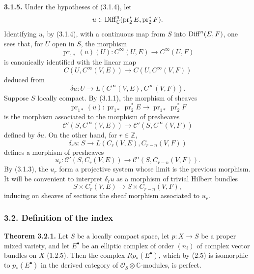 \documentclass[11pt]{article}
\begin{document}
\textbf{3.1.5.} Under the hypotheses of (3.1.4), let
\[
 u\in\operatorname{Diff}^n_{\mathbb C}(\operatorname{pr}_2^*E,\operatorname{pr}_2^*F).
\]
Identifying $u$, by (3.1.4), with a continuous map from $S$ into $\operatorname{Diff}^n(E,F)$, one sees that, for $U$ open in $S$, the morphism
\[
 \operatorname{pr}_{1*}(u)(U):C^\infty(U,E)\longrightarrow C^\infty(U,F)
\]
is canonically identified with the linear map
\[
 C(U,C^\infty(V,E))\longrightarrow C(U,C^\infty(V,F))
\]
deduced from
\[
 \delta u:U\longrightarrow L(C^\infty(V,E),C^\infty(V,F)).
\]
Suppose $S$ locally compact. By (3.1.1), the morphism of sheaves
\[
 \operatorname{pr}_{1*}(u):
 \operatorname{pr}_{1*}\operatorname{pr}_2^*E
 \longrightarrow
 \operatorname{pr}_{1*}\operatorname{pr}_2^*F
\]
is the morphism associated to the morphism of presheaves
\[
 \mathcal C'(S,C^\infty(V,E))\longrightarrow \mathcal C'(S,C^\infty(V,F))
\]
defined by $\delta u$. On the other hand, for $r\in\mathbb Z$,
\[
 \delta_r u:S\longrightarrow L(C_r(V,E),C_{r-n}(V,F))
\]
defines a morphism of presheaves
\[
 u_r:\mathcal C'(S,C_r(V,E))\longrightarrow \mathcal C'(S,C_{r-n}(V,F)).
\]
By (3.1.3), the $u_r$ form a projective system whose limit is the previous morphism. It will be convenient to interpret $\delta_r u$ as a morphism of trivial Hilbert bundles
\[
 S\times C_r(V,E)\longrightarrow S\times C_{r-n}(V,F),
\]
inducing on sheaves of sections the sheaf morphism associated to $u_r$.

\subsubsection*{3.2. Definition of the index}

\textbf{Theorem 3.2.1.} Let $S$ be a locally compact space, let $p:X\to S$ be a proper mixed variety, and let $E^\bullet$ be an elliptic complex of order $(n_i)$ of complex vector bundles on $X$ (1.2.5). Then the complex $Rp_*(E^\bullet)$, which by (2.5) is isomorphic to $p_*(E^\bullet)$ in the derived category of $\mathcal O_S\otimes\mathbb C$-modules, is perfect.
\end{document}
